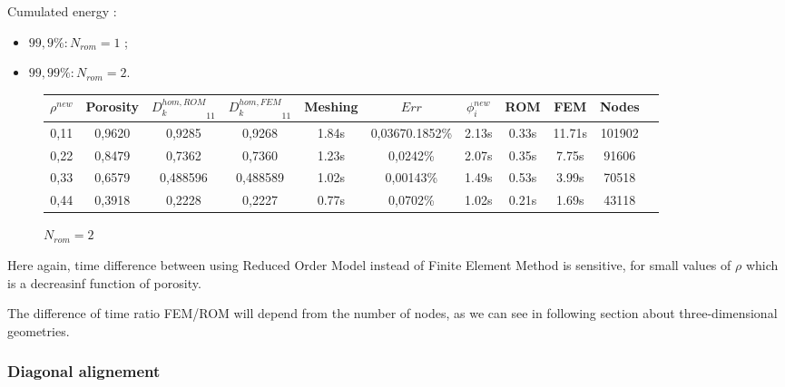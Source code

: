 \begin{multicols}{2}
Cumulated energy :

\columnbreak
\begin{itemize}
\item $99,9 \% : N_{rom}=1$ ;
\item $99,99 \% : N_{rom}=2$.
\end{itemize}
%
\end{multicols}

\begin{figure}[H]%
%
\begin{center}
\begin{tabular}{|c|c||c|c||c||c|c||c|c||c||c|}
\hline
$\rho^{new}$&Porosity&${D_k^{hom,ROM}}_{11}$&${D_k^{hom,FEM}}_{11}$&Meshing&$Err$&$\phi_i^{new}$&ROM&FEM&Nodes\\
\hline
0,11&0,9620&0,9285&0,9268&1.84s&0,03670.1852\%&2.13s&0.33s&11.71s&101902\\
\hline
0,22&0,8479&0,7362&0,7360&1.23s&0,0242\%&2.07s&0.35s&7.75s&91606\\
\hline
0,33&0,6579&0,488596&0,488589&1.02s&0,00143\%&1.49s&0.53s&3.99s&70518\\
\hline
0,44&0,3918&0,2228&0,2227&0.77s&0,0702\%&1.02s&0.21s&1.69s&43118\\
\hline
\end{tabular}
\end{center}
\caption{$N_{rom}=2$}
%
\end{figure}

Here again, time difference between using Reduced Order Model instead of Finite Element Method is sensitive, %
for small values of $\rho$ which is a decreasinf function of porosity.

\par
The difference of time ratio FEM/ROM will depend from the number of nodes, as we can see in following section about three-dimensional geometries. %
 
\subsubsection{Diagonal alignement}

